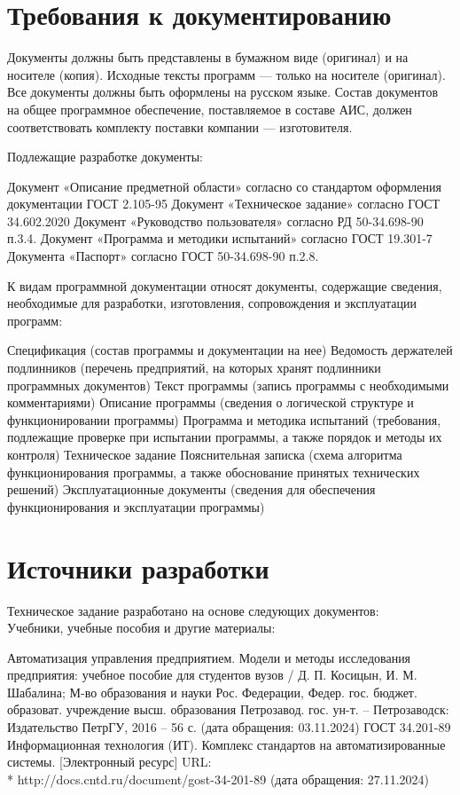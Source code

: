 \documentclass[russian, utf8, 12pt,pointsubsection,floatsubsection]{eskdtext}
\begin{document}
\section{Требования к документированию}

Документы должны быть представлены в бумажном виде (оригинал) и на носителе (копия). Исходные тексты программ --- только на носителе (оригинал).
Все документы должны быть оформлены на русском языке. Состав документов на общее программное обеспечение, поставляемое в составе АИС, должен соответствовать комплекту поставки компании --- изготовителя.

Подлежащие разработке документы:
\begin{enumerate}
Документ «Описание предметной области» согласно со стандартом оформления документации ГОСТ 2.105-95
Документ «Техническое задание» согласно ГОСТ 34.602.2020
Документ «Руководство пользователя» согласно РД 50-34.698-90 п.3.4.
Документ «Программа и методики испытаний» согласно ГОСТ 19.301-7
Документа «Паспорт» согласно ГОСТ 50-34.698-90 п.2.8.
\end{enumerate}

К видам программной документации относят документы, содержащие сведения, необходимые для разработки, изготовления, сопровождения и эксплуатации программ:
\begin{enumerate}
Спецификация (состав программы и документации на нее)
Ведомость держателей подлинников (перечень предприятий, на которых хранят подлинники программных документов)
Текст программы (запись программы с необходимыми комментариями)
Описание программы (сведения о логической структуре и функционировании программы)
Программа и методика испытаний (требования, подлежащие проверке при испытании программы, а также порядок и методы их контроля)
Техническое задание
Пояснительная записка (схема алгоритма функционирования программы, а также обоснование принятых технических решений)
Эксплуатационные документы (сведения для обеспечения функционирования и эксплуатации программы)
\end{enumerate}

\newpage
\section{Источники разработки}
Техническое задание разработано на основе следующих документов:\\

Учебники, учебные пособия и другие материалы:
\begin{enumerate}
Автоматизация управления предприятием. Модели и методы исследования предприятия: учебное пособие для студентов вузов / Д. П. Косицын, И. М. Шабалина; М-во образования и науки Рос. Федерации, Федер. гос. бюджет. образоват. учреждение высш. образования Петрозавод. гос. ун-т. – Петрозаводск: Издательство ПетрГУ, 2016 – 56 с. (дата обращения: 03.11.2024)
ГОСТ 34.201-89 Информационная технология (ИТ). Комплекс стандартов на автоматизированные системы. [Электронный ресурс] URL:\\* http://docs.cntd.ru/document/gost-34-201-89 (дата обращения: 27.11.2024)
\end{enumerate}
\end{document}
